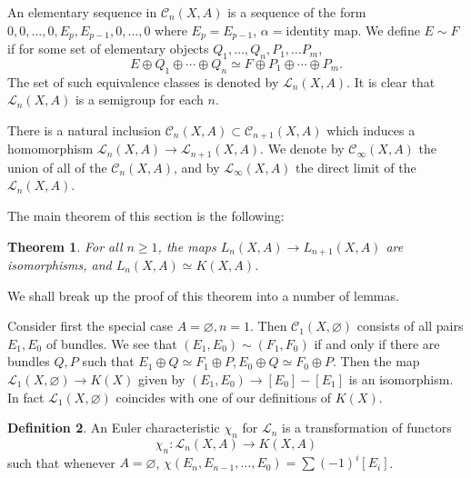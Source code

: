 \documentclass[leqno]{book}
\numberwithin{equation}{section}
\newtheorem{theorem}{Theorem}[section]%
\theoremstyle{definition}
\newtheorem{definition}[theorem]{Definition}
\begin{document}
            An elementary sequence in $\mathcal{C}_{n}(X,A)$ is a sequence of the form $0,0, \ldots ,0,E_{p},E_{p-1},0, \ldots ,0$ where $E_{p}=E_{p-1}$, $\alpha=\text{identity map}$. We define $E\sim F$ if for some set of elementary objects $Q_1, \ldots ,Q_{n},P_1, \ldots P_{m}$,
            \begin{equation*}
              E\oplus Q_{1}\oplus \cdots \oplus Q_{n}\simeq F\oplus P_1\oplus \cdots\oplus P_{m}.
            \end{equation*}
            The set of such equivalence classes is denoted by $\mathcal{L}_{n}(X,A)$. It is clear that $\mathcal{L}_{n}(X,A)$ is a semigroup for each $n$.

            There is a natural inclusion $\mathcal{C}_{n}(X,A)\subset \mathcal{C}_{n+1}(X,A)$ which induces a homomorphism $\mathcal{L}_{n}(X,A)\to \mathcal{L}_{n+1}(X,A)$. We denote by $\mathcal{C}_{\infty}(X,A)$ the union of all of the $\mathcal{C}_{n}(X,A)$, and by $\mathcal{L}_{\infty}(X,A)$ the direct limit of the $\mathcal{L}_{n}(X,A)$.

            The main theorem of this section is the following:

            \begin{theorem}
              For all $n\ge 1$, the maps $L_{n}(X,A)\to L_{n+1}(X,A)$ are isomorphisms, and $L_{n}(X,A)\simeq K(X,A)$.
            \end{theorem}

            We shall break up the proof of this theorem into a number of lemmas.

            Consider first the special case $A=\varnothing, n=1$. Then $\mathcal{C}_{1}(X,\varnothing)$ consists of all pairs $E_1,E_0$ of bundles. We see that $(E_1,E_0)\sim (F_1,F_0)$ if and only if there are bundles $Q,P$ such that $E_1\oplus Q\simeq F_1\oplus P, E_0\oplus Q\simeq F_0\oplus P$. Then the map $\mathcal{L}_{1}(X,\varnothing)\to K(X)$ given by $(E_1,E_0)\to [E_0]-[E_1]$ is an isomorphism. In fact $\mathcal{L}_{1}(X,\varnothing)$ coincides with one of our definitions of $K(X)$.

            \begin{definition}
              An Euler characteristic $\chi_{n}$ for $\mathcal{L}_{n}$ is a transformation of functors
              \begin{equation*}
                \chi_{n}:\mathcal{L}_{n}(X,A)\to K(X,A)
              \end{equation*}
              such that whenever $A=\varnothing$, $\chi(E_{n},E_{n-1}, \ldots ,E_0)=\sum(-1)^{i}[E_{i}]$.
            \end{definition}
\end{document}
